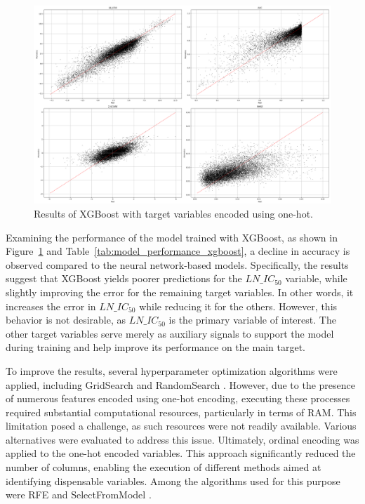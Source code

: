 \begin{figure}[H]
    \centering
    \includegraphics[width=1\textwidth]{figures/xgboost_reg/xgboost_reg_all_one_hot.png}
    \caption{Results of XGBoost with target variables encoded using one-hot.}
    \label{fig:train_xgboost_reg}
\end{figure}

Examining the performance of the model trained with XGBoost, as shown in Figure~\ref{fig:train_xgboost_reg} and Table~\ref{tab:model_performance_xgboost}, a decline in accuracy is observed compared to the neural network-based models. Specifically, the results suggest that XGBoost yields poorer predictions for the \(LN\_IC_{50}\) variable, while slightly improving the error for the remaining target variables. In other words, it increases the error in \(LN\_IC_{50}\) while reducing it for the others. However, this behavior is not desirable, as \(LN\_IC_{50}\) is the primary variable of interest. The other target variables serve merely as auxiliary signals to support the model during training and help improve its performance on the main target.

To improve the results, several hyperparameter optimization algorithms were applied, including GridSearch \cite{scikit-learn-gridsearchcv} and RandomSearch \cite{scikit-learn-randomizedsearchcv}. However, due to the presence of numerous features encoded using one-hot encoding, executing these processes required substantial computational resources, particularly in terms of RAM. This limitation posed a challenge, as such resources were not readily available. Various alternatives were evaluated to address this issue. Ultimately, ordinal encoding \cite{scikit-learn-onehotencoder} was applied to the one-hot encoded variables. This approach significantly reduced the number of columns, enabling the execution of different methods aimed at identifying dispensable variables. Among the algorithms used for this purpose were RFE \cite{scikit-learn-rfe} and SelectFromModel \cite{scikit-learn-selectfrommodel}.

